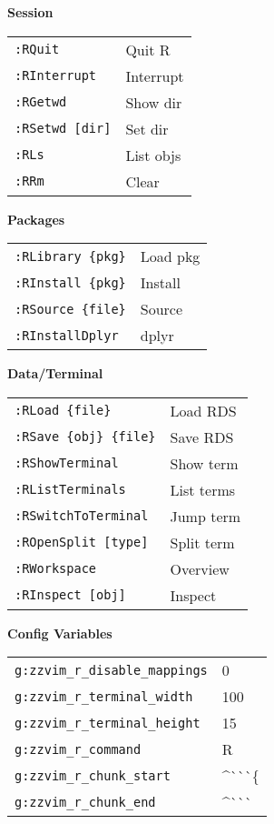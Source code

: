 \documentclass[10pt,a4paper]{article}
\begin{document}
\begin{multicols}{3}
\vspace{3pt}
\textbf{Session}\\
\begin{tabular}{@{}L{1.5cm}L{1.3cm}@{}}
\texttt{:RQuit} & Quit R \\
\texttt{:RInterrupt} & Interrupt \\
\texttt{:RGetwd} & Show dir \\
\texttt{:RSetwd [dir]} & Set dir \\
\texttt{:RLs} & List objs \\
\texttt{:RRm} & Clear \\
\end{tabular}

\vspace{3pt}
\textbf{Packages}\\
\begin{tabular}{@{}L{1.5cm}L{1.3cm}@{}}
\texttt{:RLibrary \{pkg\}} & Load pkg \\
\texttt{:RInstall \{pkg\}} & Install \\
\texttt{:RSource \{file\}} & Source \\
\texttt{:RInstallDplyr} & dplyr \\
\end{tabular}

\textbf{Data/Terminal}\\
\begin{tabular}{@{}L{1.5cm}L{1.3cm}@{}}
\texttt{:RLoad \{file\}} & Load RDS \\
\texttt{:RSave \{obj\} \{file\}} & Save RDS \\
\texttt{:RShowTerminal} & Show term \\
\texttt{:RListTerminals} & List terms \\
\texttt{:RSwitchToTerminal} & Jump term \\
\texttt{:ROpenSplit [type]} & Split term \\
\texttt{:RWorkspace} & Overview \\
\texttt{:RInspect [obj]} & Inspect \\
\end{tabular}

\vspace{4pt}
\textbf{Config Variables}\\
\begin{tabular}{@{}L{2.0cm}L{0.8cm}@{}}
\texttt{g:zzvim\_r\_disable\_mappings} & 0 \\
\texttt{g:zzvim\_r\_terminal\_width} & 100 \\
\texttt{g:zzvim\_r\_terminal\_height} & 15 \\
\texttt{g:zzvim\_r\_command} & R \\
\texttt{g:zzvim\_r\_chunk\_start} & \^{}\`{}\`{}\`{}\{ \\
\texttt{g:zzvim\_r\_chunk\_end} & \^{}\`{}\`{}\`{} \\
\end{tabular}


\end{multicols}
\end{document}
